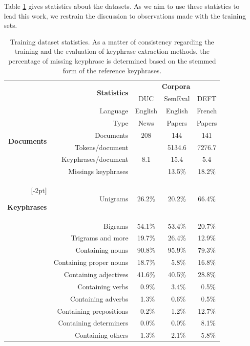     Table \ref{tab:dataset_statistics} gives statistics about the datasets. As
    we aim to use these statistics to lead this work, we restrain the discussion
    to observations made with the training sets.
    \begin{table}
      \centering
      \begin{tabular}{rrccc}
        \toprule
        & \multirow{2}{*}[-2pt]{\textbf{Statistics}} & \multicolumn{3}{c}{\textbf{Corpora}}\\
        \cmidrule{3-5}
        & & DUC & SemEval & DEFT\\
        \midrule
        \multirow{6}{*}[-2pt]{\begin{sideways}\textbf{Documents}\end{sideways}} & Language & English & English & French\\
        & Type & News & Papers & Papers\\
        & Documents & 208 & 144 & 141\\
        & Tokens/document & & 5134.6 & 7276.7\\
        & Keyphrases/document & 8.1 & 15.4 & 5.4\\
        & Missings keyphrases & & 13.5\% & 18.2\%\\
        \addlinespace[\defaultaddspace]
        \multirow{11}{*}[-2pt]{\begin{sideways}\textbf{Keyphrases}\end{sideways}} & Unigrams & 26.2\% & 20.2\% & 66.4\%\\
        & Bigrams & 54.1\% & 53.4\% & 20.7\%\\
        & Trigrams and more & 19.7\% & 26.4\% & 12.9\%\\
        & Containing nouns & 90.8\% & 95.9\% & 79.3\%\\
        & Containing proper nouns & 18.7\% & $~~$5.8\% & 16.8\%\\
        & Containing adjectives & 41.6\% & 40.5\% & 28.8\%\\
        & Containing verbs & $~~$0.9\% & $~~$3.4\% & $~~$0.5\%\\
        & Containing adverbs & $~~$1.3\% & $~~$0.6\% & $~~$0.5\%\\
        & Containing prepositions & $~~$0.2\% & $~~$1.2\% & 12.7\%\\
        & Containing determiners & $~~$0.0\% & $~~$0.0\% & $~~$8.1\%\\
        & Containing others & $~~$1.3\% & $~~$2.1\% & $~~$5.8\%\\
        \bottomrule
      \end{tabular}
      \caption{Training dataset statistics. As a matter of consistency regarding
               the training and the evaluation of keyphrase extraction methods,
               the percentage of missing keyphrase is determined based on the
               stemmed form of the reference keyphrases.
               \label{tab:dataset_statistics}}
    \end{table}

